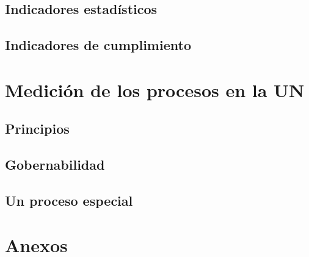 \documentclass[]{book}
\begin{document}
\section{Indicadores estadísticos}\label{indicadores-estadisticos}

\section{Indicadores de cumplimiento}\label{indicadores-de-cumplimiento}

\chapter{Medición de los procesos en la UN}\label{indicadoresUN}

\section{Principios}\label{principios}

\section{Gobernabilidad}\label{gobernabilidad}

\section{Un proceso especial}\label{un-proceso-especial}

\chapter*{Anexos}\label{anexos}


\end{document}
